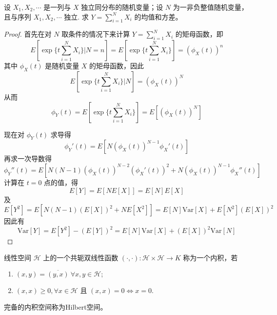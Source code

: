 \documentclass[lang=cn,10pt,thmcnt=section]{elegantbook}
\begin{document}
\begin{example}[随机个随机变量之和]
	设 $X_1, X_2, \cdots$ 是一列与 $X$ 独立同分布的随机变量；设 $N$ 为一非负整值随机变量，且与序列 $X_1, X_2, \cdots$ 独立. 求 $Y = \sum_{i=1}^{N} X_i$ 的均值和方差。
\end{example}
\begin{proof}
	首先在对 $N$ 取条件的情况下来计算 $Y = \sum_{i=1}^{N} X_i$ 的矩母函数，即
\[
E[\exp\{t \sum_{i=1}^{N} X_i\}|N = n] = E[\exp\{t \sum_{i=1}^{N} X_i\}] = (\phi_X(t))^n
\]
其中 $\phi_X(t)$ 是随机变量 $X$ 的矩母函数，因此
\[
E[\exp\{t \sum_{i=1}^{N} X_i\}|N] = (\phi_X(t))^N
\]
从而
\[
\phi_Y(t) = E[\exp\{t \sum_{i=1}^{N} X_i\}] = E[(\phi_X(t))^N]
\]

现在对 $\phi_Y(t)$ 求导得
\[
\phi_Y'(t) = E[N(\phi_X(t))^{N-1} \phi_X'(t)]
\]
再求一次导数得
\[
\phi_Y''(t) = E[N(N-1)(\phi_X(t))^{N-2} (\phi_X'(t))^2 + N(\phi_X(t))^{N-1} \phi_X''(t)]
\]
计算在 $t = 0$ 点的值，得
\[
E[Y] = E[N E[X]] = E[N] E[X] 
\]
及
\[
E[Y^2] = E[N(N-1)(E[X])^2 + N E[X^2]] = E[N] \text{Var}[X] + E[N^2] (E[X])^2
\]
因此有
\[
\text{Var}[Y] = E[Y^2] - (E[Y])^2 = E[N] \text{Var}[X] + (E[X])^2 \text{Var}[N] 
\]
\end{proof}

\begin{definition}
	线性空间 $\mathcal{H}$ 上的一个共轭双线性函数 $(\cdot, \cdot) : \mathcal{H} \times \mathcal{H} \rightarrow K$ 称为一个内积，若
\begin{enumerate}
    \item $(x, y) = \overline{(y, x)} \ \forall x, y \in \mathcal{H}$;
    \item $(x, x) \geq 0, \forall x \in \mathcal{H}$ 且 $(x, x) = 0 \Leftrightarrow x = 0$.
\end{enumerate}
完备的内积空间称为Hilbert空间。
\end{definition}
\end{document}
